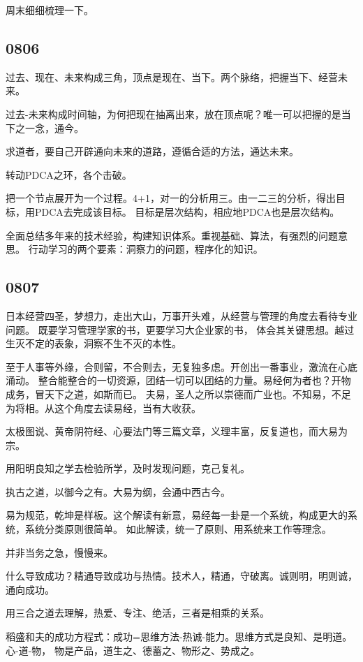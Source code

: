 周末细细梳理一下。

\subsection{0806}

过去、现在、未来构成三角，顶点是现在、当下。两个脉络，把握当下、经营未来。

过去-未来构成时间轴，为何把现在抽离出来，放在顶点呢？唯一可以把握的是当下之一念，通今。

求道者，要自己开辟通向未来的道路，遵循合适的方法，通达未来。

转动PDCA之环，各个击破。

把一个节点展开为一个过程。4+1，对一的分析用三。由一二三的分析，得出目标，用PDCA去完成该目标。
目标是层次结构，相应地PDCA也是层次结构。

全面总结多年来的技术经验，构建知识体系。重视基础、算法，有强烈的问题意思。
行动学习的两个要素：洞察力的问题，程序化的知识。

\subsection{0807}

日本经营四圣，梦想力，走出大山，万事开头难，从经营与管理的角度去看待专业问题。
既要学习管理学家的书，更要学习大企业家的书，
体会其关键思想。越过生灭不定的表象，洞察不生不灭的本性。

至于人事等外缘，合则留，不合则去，无复独多虑。开创出一番事业，激流在心底涌动。
整合能整合的一切资源，团结一切可以团结的力量。易经何为者也？开物成务，冒天下之道，如斯而已。
夫易，圣人之所以崇德而广业也。不知易，不足为将相。从这个角度去读易经，当有大收获。

太极图说、黄帝阴符经、心要法门等三篇文章，义理丰富，反复道也，而大易为宗。

用阳明良知之学去检验所学，及时发现问题，克己复礼。

执古之道，以御今之有。大易为纲，会通中西古今。

易为规范，乾坤是样板。这个解读有新意，易经每一卦是一个系统，构成更大的系统，系统分类原则很简单。
如此解读，统一了原则、用系统来工作等理念。

并非当务之急，慢慢来。

什么导致成功？精通导致成功与热情。技术人，精通，守破离。诚则明，明则诚，通向成功。

用三合之道去理解，热爱、专注、绝活，三者是相乘的关系。

稻盛和夫的成功方程式：成功=思维方法-热诚-能力。思维方式是良知、是明道。心-道-物，
物是产品，道生之、德蓄之、物形之、势成之。

